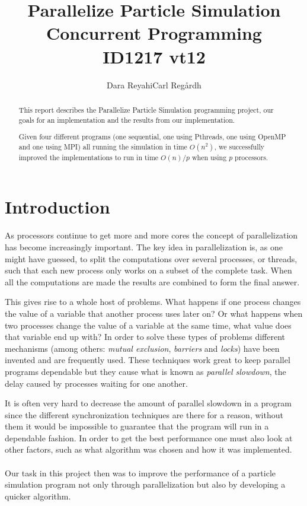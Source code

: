 \documentclass[11pt,a4paper]{article}
\begin{document}
\title{Parallelize Particle Simulation \\ Concurrent Programming \\ ID1217 vt12}
\author{Dara Reyahi\quad \quad \quad \quad \quad \quad Carl Reg\aa rdh}
\date{}
\maketitle
\thispagestyle{empty}
\newpage
\thispagestyle{empty}
\begin{abstract}
This report describes the Parallelize Particle Simulation programming project, our goals for an implementation and the results from our implementation. 

Given four different programs (one sequential, one using Pthreads, one using OpenMP and one using MPI) all running the simulation in time $O(n^{2})$, we successfully improved the implementations to run in time $O(n)/p$ when using $p$ processors.
\end{abstract}
\newpage
\section{Introduction}
 \setcounter{page}{1}
As processors continue to get more and more cores the concept of parallelization has become increasingly important. The key idea in parallelization is, as one might have guessed, to split the computations over several processes, or threads, such that each new process only works on a subset of the complete task. When all the computations are made the results are combined to form the final answer.

This gives rise to a whole host of problems. What happens if one process changes the value of a variable that another process uses later on? Or what happens when two processes change the value of a variable at the same time, what value does that variable end up with? In order to solve these types of problems different mechanisms (among others: \emph{mutual exclusion}, \emph{barriers} and \emph{locks}) have been invented and are frequently used. These techniques work great to keep parallel programs dependable but they cause what is known as \emph{parallel slowdown}, the delay caused by processes waiting for one another.

It is often very hard to decrease the amount of parallel slowdown in a program since the different synchronization techniques are there for a reason, without them it would be impossible to guarantee that the program will run in a dependable fashion. In order to get the best performance one must also look at other factors, such as what algorithm was chosen and how it was implemented.
\\
\\
Our task in this project then was to improve the performance of a particle simulation program not only through parallelization but also by developing a quicker algorithm.
\end{document}
